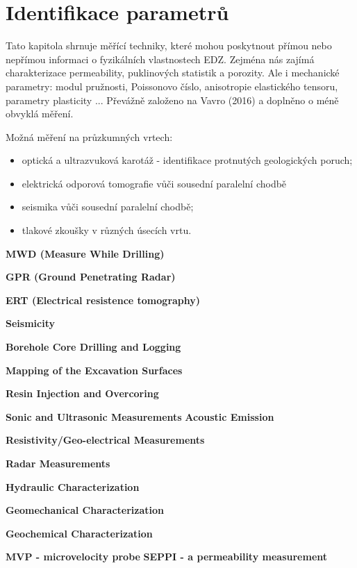 \documentclass{article}
\begin{document}
\section{Identifikace parametrů}
\label{sec:parameters}

Tato kapitola shrnuje měřící techniky, které mohou poskytnout přímou nebo nepřímou informaci 
o fyzikálních vlastnostech EDZ. Zejména nás zajímá charakterizace permeability, puklinových statistik a porozity. Ale i mechanické parametry: modul pružnosti, Poissonovo číslo, anisotropie elastického tensoru,  parametry plasticity ...
Převážně založeno na Vavro (2016) \cite{SURAO_50/2016} a doplněno o méně obvyklá měření.


Možná měření na průzkumných vrtech:
    \begin{itemize}
        \item optická a ultrazvuková karotáž - identifikace protnutých geologických poruch;
        \item elektrická odporová tomografie vůči sousední paralelní chodbě
        \item seismika vůči sousední paralelní chodbě;
        \item tlakové zkoušky v různých úsecích vrtu.
    \end{itemize}

{\bf MWD (Measure While Drilling)} \cite{JeroenvanEldert2018}

{\bf GPR (Ground Penetrating Radar)} 

{\bf ERT (Electrical resistence tomography)}


{\bf Seismicity}

{\bf  Borehole Core Drilling and Logging} \cite{Lanyon2011}

{\bf Mapping of the Excavation Surfaces} \cite{Lanyon2011}

{\bf  Resin Injection and Overcoring} \cite{Lanyon2011}

{\bf  Sonic and Ultrasonic Measurements} \cite{Lanyon2011}
{\bf  Acoustic Emission} \cite{Lanyon2011}

{\bf  Resistivity/Geo-electrical Measurements} \cite{Lanyon2011}

{\bf  Radar Measurements} \cite{Lanyon2011}

{\bf  Hydraulic Characterization} \cite{Lanyon2011}

{\bf  Geomechanical Characterization} \cite{Lanyon2011}

{\bf  Geochemical Characterization} \cite{Lanyon2011}

{\bf MVP - microvelocity probe} \cite{Rutqvist2009} 
{\bf SEPPI - a permeability measurement} \cite{Rutqvist2009} 
\end{document}
